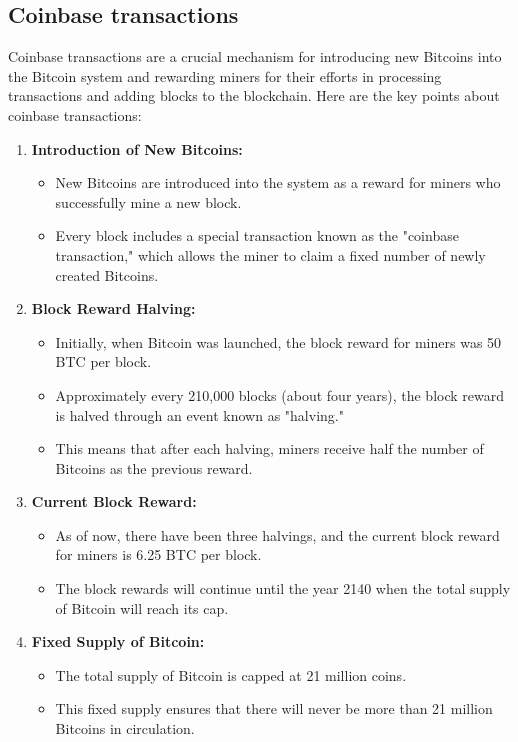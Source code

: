 \subsection{Coinbase transactions}
Coinbase transactions are a crucial mechanism for introducing new Bitcoins into the Bitcoin system and rewarding miners for their efforts in processing transactions and adding blocks to the blockchain. Here are the key points about coinbase transactions:
\begin{enumerate}
    \item \textbf{Introduction of New Bitcoins:}
    \begin{itemize}
        \item New Bitcoins are introduced into the system as a reward for miners who successfully mine a new block.
        \item Every block includes a special transaction known as the "coinbase transaction," which allows the miner to claim a fixed number of newly created Bitcoins.
    \end{itemize}
    \item \textbf{Block Reward Halving:}
    \begin{itemize}
        \item Initially, when Bitcoin was launched, the block reward for miners was 50 BTC per block.
        \item Approximately every 210,000 blocks (about four years), the block reward is halved through an event known as "halving."
        \item This means that after each halving, miners receive half the number of Bitcoins as the previous reward.
    \end{itemize}
    \item \textbf{Current Block Reward:}
    \begin{itemize}
        \item As of now, there have been three halvings, and the current block reward for miners is 6.25 BTC per block.
        \item The block rewards will continue until the year 2140 when the total supply of Bitcoin will reach its cap.
    \end{itemize}
    \item \textbf{Fixed Supply of Bitcoin:}
    \begin{itemize}
        \item The total supply of Bitcoin is capped at 21 million coins.
        \item This fixed supply ensures that there will never be more than 21 million Bitcoins in circulation.

\end{itemize}
\end{enumerate}
